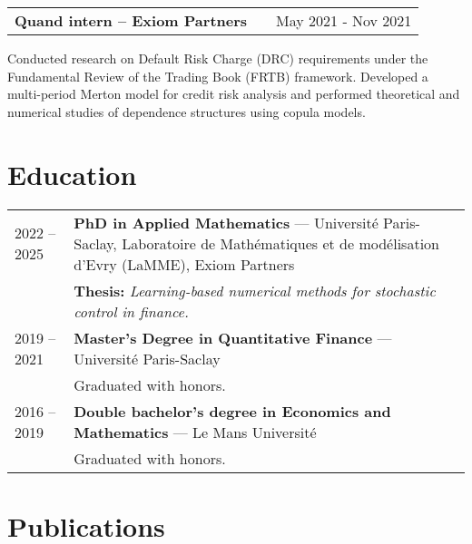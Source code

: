\documentclass[a4paper,12pt]{article}
\makeatletter
\newenvironment{jobshort}[2]
    {
    \begin{tabularx}{\linewidth}{@{}l X r@{}}
    \textbf{#1} & \hfill &  #2 \\[3.75pt]
    \end{tabularx}
    }
    {
    }
\makeatother
\begin{document}
	\begin{jobshort}{Quand intern -- Exiom Partners}{May 2021 - Nov 2021}
	Conducted research on Default Risk Charge (DRC) requirements under the Fundamental Review of the Trading Book (FRTB) framework.
	Developed a multi-period Merton model for credit risk analysis and performed theoretical and numerical studies of dependence structures using copula models.
	\end{jobshort}

	\section{Education}
	\begin{tabularx}{\linewidth}{@{}l X@{}}	
		2022 -- 2025 & \textbf{PhD in Applied Mathematics} — Université Paris-Saclay, Laboratoire de Mathématiques et de modélisation d'Evry (LaMME), Exiom Partners \\
		& \textbf{Thesis:} \textit{Learning-based numerical methods for stochastic control in finance.} \\
		2019 -- 2021 & \textbf{Master’s Degree in Quantitative Finance} — Université Paris-Saclay \\
		& Graduated with honors. \\
		2016 -- 2019 & \textbf{Double bachelor’s degree in Economics and Mathematics} — Le Mans Université \\
		& Graduated with honors.
	\end{tabularx}

	\section{Publications}
	\begin{refsection}
	\nocite{*}
	\printbibliography[heading=none]
	\end{refsection}

\end{document}
